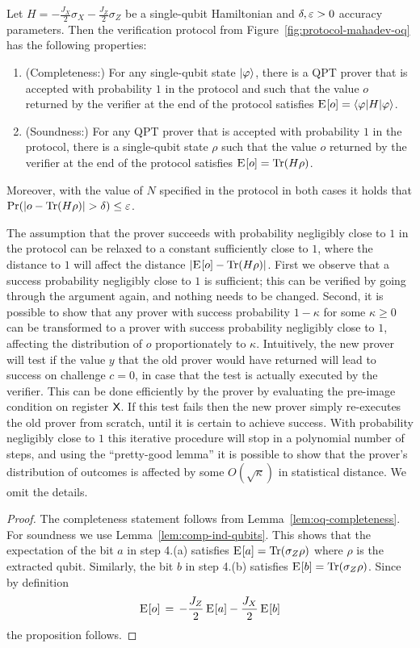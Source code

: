 \begin{proposition}
Let $H = -\frac{J_X}{2} \sigma_X -\frac{ J_Z}{2}\sigma_Z$ be a single-qubit Hamiltonian and $\delta,\varepsilon>0$ accuracy parameters. Then the verification protocol from Figure~\ref{fig:protocol-mahadev-oq} has the following properties:
\begin{enumerate}
\item (Completeness:) For any single-qubit state $|\varphi\rangle$, there is a QPT prover that is accepted with probability $1$ in the protocol and such that the value $o$ returned by the verifier at the end of the protocol satisfies $\textsc{E}_{}[o] = \langle\varphi| H |\varphi\rangle$.
\item (Soundness:) For any QPT prover that is accepted with probability  $1$ in the protocol, there is a single-qubit state $\rho$ such that the value $o$ returned by the verifier at the end of the protocol satisfies $\textsc{E}_{}[o] = \mbox{\rm Tr}(H\rho)$. 
\end{enumerate}
Moreover, with the value of $N$ specified in the protocol in both cases it holds that $\Pr(|o-\mbox{\rm Tr}(H\rho)| > \delta)\leq \varepsilon$.
\end{proposition}

\begin{remark}
The assumption that the prover succeeds with probability negligibly close to $1$ in the protocol can be relaxed to a constant sufficiently close to $1$, where the distance to $1$ will affect the distance $|\textsc{E}_{}[{o}] - \mbox{\rm Tr}(H\rho)|$. First we observe that a success probability negligibly close to $1$ is sufficient; this can be verified by going through the argument again, and nothing needs to be changed. Second, it is possible to show that any prover with success probability $1-\kappa$ for some $\kappa \geq 0$ can be transformed to a prover with success probability negligibly close to $1$, affecting the distribution of $o$ proportionately to $\kappa$. Intuitively, the new prover will test if the value $y$ that the old prover would have returned will lead to success on challenge $c=0$, in case that the test is actually executed by the verifier. This can be done efficiently by the prover by evaluating the pre-image condition on register ${\textsf{X}}$. If this test fails then the new prover simply re-executes the old prover from scratch, until it is certain to achieve success. With probability negligibly close to $1$ this iterative procedure will stop in a polynomial number of steps, and using the ``pretty-good lemma'' it is possible to show that the prover's distribution of outcomes is affected by some $O(\sqrt{\kappa})$ in statistical distance. We omit the details. 
\end{remark}

\begin{proof}
The completeness statement follows from Lemma~\ref{lem:oq-completeness}. For soundness we use Lemma~\ref{lem:comp-ind-qubits}. This shows that the expectation of the bit $a$ in step 4.(a) satisfies $\textsc{E}_{} [a] =  \mbox{\rm Tr}(\sigma_Z \rho)$ where $\rho$ is the extracted qubit. Similarly, the bit $b$ in step 4.(b) satisfies $\textsc{E}_{} [b] =  \mbox{\rm Tr}(\sigma_Z \rho)$. Since by definition
\[\textsc{E}_{} [o] \,=\, -\frac{J_Z}{2}\, \textsc{E}_{} [a] - \frac{J_X}{2}\, \textsc{E}_{} [b] \]
the proposition follows. 
\end{proof}


